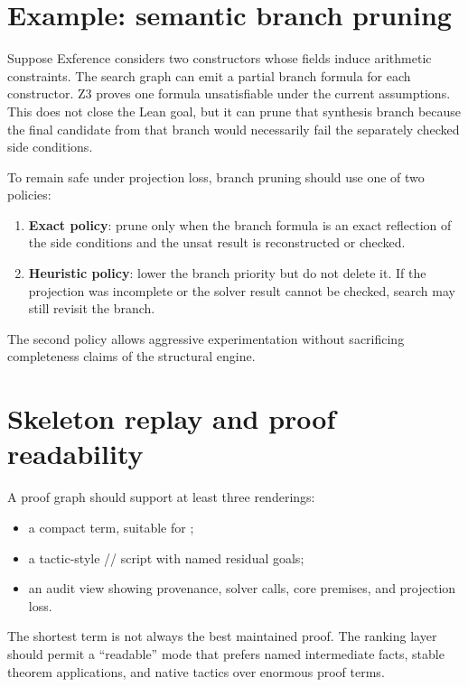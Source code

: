 \documentclass[11pt,letterpaper,openany]{report}
\newcommand{\code}[1]{\texttt{\detokenize{#1}}}
\begin{document}
\section{Example: semantic branch pruning}

Suppose Exference considers two constructors whose fields induce arithmetic
constraints. The search graph can emit a partial branch formula for each constructor.
Z3 proves one formula unsatisfiable under the current assumptions. This does not close
the Lean goal, but it can prune that synthesis branch because the final candidate from
that branch would necessarily fail the separately checked side conditions.

To remain safe under projection loss, branch pruning should use one of two policies:

\begin{enumerate}
  \item \textbf{Exact policy}: prune only when the branch formula is an exact
        reflection of the side conditions and the unsat result is reconstructed or
        checked.
  \item \textbf{Heuristic policy}: lower the branch priority but do not delete it. If
        the projection was incomplete or the solver result cannot be checked, search
        may still revisit the branch.
\end{enumerate}

The second policy allows aggressive experimentation without sacrificing completeness
claims of the structural engine.

\section{Skeleton replay and proof readability}

A proof graph should support at least three renderings:

\begin{itemize}
  \item a compact term, suitable for \code{exact};
  \item a tactic-style \code{intro}/\code{refine}/\code{cases} script with named
        residual goals;
  \item an audit view showing provenance, solver calls, core premises, and projection
        loss.
\end{itemize}

The shortest term is not always the best maintained proof. The ranking layer should
permit a ``readable'' mode that prefers named intermediate facts, stable theorem
applications, and native tactics over enormous proof terms.
\end{document}
